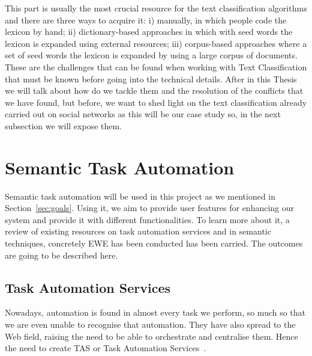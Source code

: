 

This part is usually the most crucial resource for the text classification algorithms and there are three ways to acquire it: i) manually, in which people code the lexicon by hand; ii) dictionary-based approaches in which with seed words the lexicon is expanded using external resources; iii) corpus-based approaches where a set of seed words the lexicon is expanded by using a large corpus of documents.\\

These are the challenges that can be found when working with Text Classification that must be known before going into the technical details. After in this Thesis we will talk about how do we tackle them and the resolution of the conflicts that we have found, but before, we want to shed light on the text classification already carried out on social networks as this will be our case study so, in the next subsection we will expose them.


\section{Semantic Task Automation}

Semantic task automation will be used in this project as we mentioned in Section~\ref{sec:goals}. Using it, we aim to provide user features for enhancing our system and provide it with different functionalities. To learn more about it, a review of existing resources on task automation services and in semantic techniques, concretely EWE has been conducted has been carried.  The outcomes are going to be described here.

\subsection{Task Automation Services}
Nowadays, automation is found in almost every task we perform, so much so that we are even unable to recognise that automation. They have also spread to the Web field, raising the need to be able to orchestrate and centralise them. Hence the need to create TAS or Task Automation Services~\cite{7155422}.

